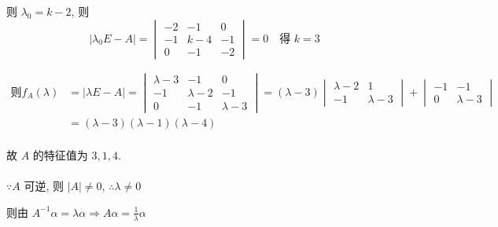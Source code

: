 		 则 \( \lambda_{0} = k - 2 \), 则
		 \[ |\lambda_{0}E - A| = \begin{vmatrix}
				 -2 & -1    & 0  \\
				 -1 & k - 4 & -1 \\
				 0  & -1    & -2
			 \end{vmatrix} = 0 \quad \text{得 } k = 3 \]

		 \( \begin{aligned} \text{则}
			 f_{A}(\lambda) & = |\lambda E - A| = \begin{vmatrix}
				                                      \lambda - 3 & -1          & 0           \\
				                                      -1          & \lambda - 2 & -1          \\
				                                      0           & -1          & \lambda - 3
			                                      \end{vmatrix} = (\lambda - 3)
			 \begin{vmatrix}
				 \lambda - 2 & 1           \\
				 -1          & \lambda - 3
			 \end{vmatrix} +
			 \begin{vmatrix}
				 -1 & -1          \\
				 0  & \lambda - 3
			 \end{vmatrix}                                                             \\
			                & = (\lambda - 3)(\lambda - 1)(\lambda - 4)                   \\
		 \end{aligned} \)

		 故 \( A \) 的特征值为 \( 3, 1, 4 \).


	 \paragraph{} %
		 \( \because A \) 可逆, 则 \( |A| \neq 0 \), \( \therefore \lambda \neq 0 \)

		 则由 \( A^{-1}\alpha = \lambda\alpha \Rightarrow A\alpha = \frac{1}{\lambda}\alpha \)

